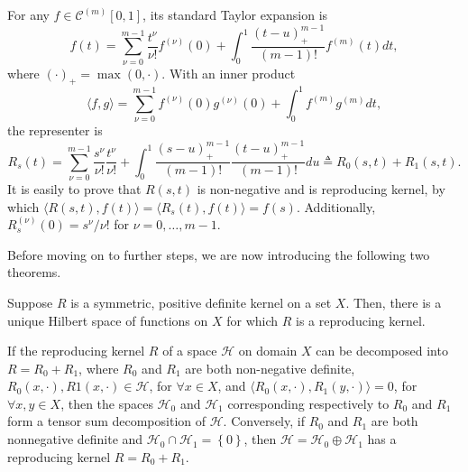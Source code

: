 For any $f\in \mathcal{C}^{(m)}[0,1]$, its standard Taylor expansion is  
\begin{equation}
f(t) = \sum_{\nu=0}^{m-1}\frac{t^\nu}{\nu!}f^{(\nu)}(0) + \int_{0}^{1}\frac{(t-u)_+^{m-1}}{(m-1)!}f^{(m)}(t)dt,
\end{equation}
where $(\cdot)_+ =\max(0, \cdot)$. With an inner product 
\begin{equation}
\langle f,g \rangle = \sum_{\nu=0}^{m-1}f^{(\nu)}(0)g^{(\nu)}(0) +  \int_{0}^{1}f^{(m)} g^{(m)}dt,
\end{equation}
the representer is 
\begin{equation}\label{GaussianProcessKernelR}
R_s(t) =\sum_{\nu=0}^{m-1} \frac{s^{\nu}}{\nu!} \frac{t^{\nu}}{\nu!} +\int_0^1\frac{ (s-u)_+^{m-1}}{(m-1)!} \frac{ (t-u)_+^{m-1}}{(m-1)!} du \triangleq R_0(s,t)+R_1(s,t). 
\end{equation}
It is easily to prove that $R(s,t)$ is non-negative and is reproducing kernel, by which $\langle R(s,t),f(t) \rangle = \langle R_s(t),f(t) \rangle=f(s)$. Additionally, $R_s^{(\nu)}(0) = s^\nu/\nu!$ for $\nu = 0,\ldots, m-1$.

Before moving on to further steps, we are now introducing the following two theorems. 
\begin{theorem}\cite{aronszajn1950theory}\label{theoremRKHS}
Suppose $R$ is a symmetric, positive definite kernel on a set $X$. Then, there is a unique Hilbert space of functions on $X$ for which $R$ is a reproducing kernel. 
\end{theorem}
\begin{theorem}\cite{gu2013smoothing}\label{theoremKernel}
If the reproducing kernel $R$ of a space $\mathcal{H}$ on domain $X$ can
be decomposed into $R = R_0 + R_1$, where $R_0$ and $R_1$ are both non-negative definite, $R_0(x, \cdot),R1(x,\cdot) \in \mathcal{H}$, for $ \forall x \in X$, and $\langle R_0(x, \cdot),R_1(y, \cdot) \rangle= 0$, for $\forall x, y \in X$, then the spaces $\mathcal{H}_0$ and $\mathcal{H}_1$ corresponding respectively to $R_0$ and $R_1$ form a tensor sum decomposition of $\mathcal{H}$. Conversely, if $R_0$ and $R_1$ are both  nonnegative definite and $\mathcal{H}_0 \cap \mathcal{H}_1 =\left\lbrace 0\right\rbrace$, then $\mathcal{H} =\mathcal{H}_0 \oplus \mathcal{H}_1$ has a reproducing kernel $R = R_0 + R_1$.
\end{theorem}

